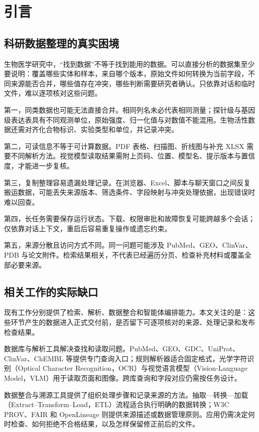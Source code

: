 \chapter{引言}\label{ch:introduction}

\section{科研数据整理的真实困境}

生物医学研究中，“找到数据”不等于找到能用的数据。可以直接分析的数据集至少要说明：覆盖哪些实体和样本，来自哪个版本，原始文件如何转换为当前字段，不同来源能否合并，哪些值存在冲突，哪些判断需要研究者确认。只依靠对话和临时文件，难以逐项核对这些问题。

第一，同类数据也可能无法直接合并。相同列名未必代表相同测量；探针级与基因级表达表具有不同观测单位，原始强度、归一化值与对数值不能混用。生物活性数据还需对齐化合物标识、实验类型和单位，并记录冲突。

第二，可读信息不等于可计算数据。PDF 表格、扫描图、折线图与补充 XLSX 需要不同解析方法。视觉模型读取结果需附上页码、位置、模型名、提示版本与置信度，才能进一步复核。

第三，复制整理容易遗漏处理记录。在浏览器、Excel、脚本与聊天窗口之间反复搬运数据，可能丢失来源版本、筛选条件、字段映射与冲突处理依据，出现错误时难以回查。

第四，长任务需要保存运行状态。下载、权限审批和故障恢复可能跨越多个会话；仅依靠对话上下文，重启后容易重复操作或遗忘约束。

第五，来源分散且访问方式不同。同一问题可能涉及 PubMed、GEO、ClinVar、PDB 与论文附件。检索结果相关，不代表已经遍历分页、检查补充材料或覆盖全部必要来源。

\section{相关工作的实际缺口}\label{sec:related}

现有工作分别提供了检索、解析、数据整合和智能体编排能力。本文关注的是：这些环节产生的数据进入正式交付前，是否留下可逐项核对的来源、处理记录和发布检查结果。

数据库与解析工具解决查找和读取问题。PubMed、GEO、GDC、UniProt、ClinVar、ChEMBL 等提供专门查询入口；规则解析器适合固定格式，光学字符识别（Optical Character Recognition，OCR）与视觉语言模型（Vision-Language Model，VLM）用于读取页面和图像。跨库查询和字段对应仍需按任务设计。

数据整合与溯源工具提供了组织处理步骤和记录来源的方法。抽取—转换—加载（Extract–Transform–Load，ETL）流程适合执行明确的数据转换；W3C PROV、FAIR 和 OpenLineage 则提供来源描述或数据管理原则。应用仍需决定何时检查、如何拒绝不合格结果，以及怎样保留修正前后的文件。

